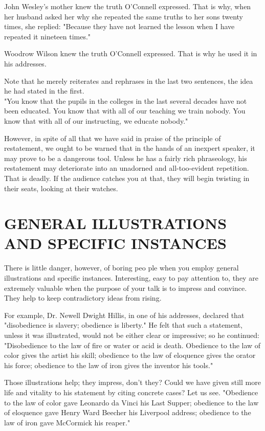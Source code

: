 \documentclass[10pt]{article}
\begin{document}
John Wesley's mother knew the truth O'Connell expressed. That is why, when her husband asked her why she repeated the same truths to her sons twenty times, she replied: "Because they have not learned the lesson when I have repeated it nineteen times."

Woodrow Wilson knew the truth O'Connell expressed. That is why he used it in his addresses.

Note that he merely reiterates and rephrases in the last two sentences, the idea he had stated in the first.\\
"You know that the pupils in the colleges in the last several decades have not been educated. You know that with all of our teaching we train nobody. You know that with all of our instructing, we educate nobody."

However, in spite of all that we have said in praise of the principle of restatement, we ought to be warned that in the hands of an inexpert speaker, it may prove to be a dangerous tool. Unless he has a fairly rich phraseology, his restatement may deteriorate into an unadorned and all-too-evident repetition. That is deadly. If the audience catches you at that, they will begin twisting in their seats, looking at their watches.

\section*{GENERAL ILLUSTRATIONS AND SPECIFIC INSTANCES}
There is little danger, however, of boring peo ple when you employ general illustrations and specific instances. Interesting, easy to pay attention to, they are extremely valuable when the purpose of your talk is to impress and convince. They help to keep contradictory ideas from rising.

For example, Dr. Newell Dwight Hillis, in one of his addresses, declared that "disobedience is slavery; obedience is liberty." He felt that such a statement, unless it was illustrated, would not be either clear or impressive; so he continued: "Disobedience to the law of fire or water or acid is death. Obedience to the law of color gives the artist his skill; obedience to the law of eloquence gives the orator his force; obedience to the law of iron gives the inventor his tools."

Those illustrations help; they impress, don't they? Could we have given still more life and vitality to his statement by citing concrete cases? Let us see. "Obedience to the law of color gave Leonardo da Vinci his Last Supper; obedience to the law of eloquence gave Henry Ward Beecher his Liverpool address; obedience to the law of iron gave McCormick his reaper."
\end{document}
